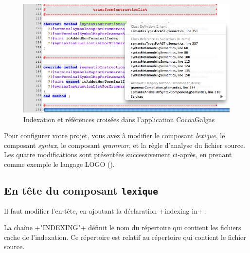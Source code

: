 
\begin{figure}[t]
  \centering
  \includegraphics[width=16cm]{chapter-cocoa-features/indexing-sample.png}
  \caption{Indexation et références croisées dans l'application CocoaGalgas}
  \ligne
\end{figure}

Pour configurer votre projet, vous avez à modifier le composant \emph{lexique}, le composant \emph{syntax}, le composant \emph{grammar}, et la règle d'analyse du fichier source. Les quatre modifications sont présentées successivement ci-après, en prenant comme exemple le langage LOGO ().


\subsection{En tête du composant \texttt{lexique}}

Il faut modifier l'en-tête, en ajoutant la déclaration  \ggs+indexing in+ :


\begin{galgas}
lexique logo_lexique indexing in "INDEXING" {
  ...
\end{galgas}

La chaîne \ggs+"INDEXING"+ définit le nom du répertoire qui contient les fichiers cache de l'indexation. Ce répertoire est relatif au répertoire qui contient le fichier source.

